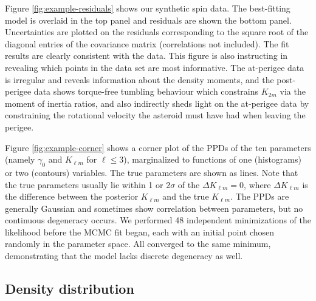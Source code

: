 \documentclass[fleqn,usenatbib]{mnras}
\begin{document}
Figure \ref{fig:example-residuals} shows our synthetic spin data. The best-fitting model is overlaid in the top panel and residuals are shown the bottom panel. Uncertainties are plotted on the residuals corresponding to the square root of the diagonal entries of the covariance matrix (correlations not included). The fit results are clearly consistent with the data. This figure is also instructing in revealing which points in the data set are most informative. The at-perigee data is irregular and reveals information about the density moments, and the post-perigee data shows torque-free tumbling behaviour which constrains $K_{2m}$ via the moment of inertia ratios, and also indirectly sheds light on the at-perigee data by constraining the rotational velocity the asteroid must have had when leaving the perigee.

Figure \ref{fig:example-corner} shows a corner plot of the PPDs of the ten parameters (namely $\gamma_0$ and $K_{\ell m}$ for $\ell \leq 3$), marginalized to functions of one (histograms) or two (contours) variables. The true parameters are shown as lines. Note that the true parameters usually lie within 1 or 2$\sigma$ of the $\Delta K_{\ell m} = 0$, where $\Delta K_{\ell m}$ is the difference between the posterior $K_{\ell m}$ and the true $K_{\ell m}$. The PPDs are generally Gaussian and sometimes show correlation between parameters, but no continuous degeneracy occurs. We performed 48 independent minimizations of the likelihood before the MCMC fit began, each with an initial point chosen randomly in the parameter space. All converged to the same minimum, demonstrating that the model lacks discrete degeneracy as well.



\subsection{Density distribution}
\label{sec:asym-density}
\end{document}
